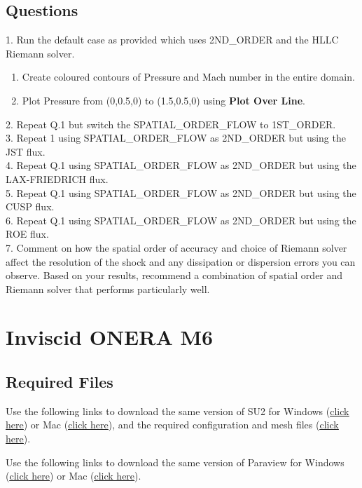 \section*{Questions}
1. Run the default case as provided which uses 2ND\_ORDER and the HLLC Riemann solver.
\begin{enumerate}[label=(\alph*)]
    \item Create coloured contours of Pressure and Mach number in the entire domain.
    \item Plot Pressure from (0,0.5,0) to (1.5,0.5,0) using \textbf{Plot Over Line}.
\end{enumerate}
2. Repeat Q.1 but switch the SPATIAL\_ORDER\_FLOW to 1ST\_ORDER. \\
3. Repeat 1 using SPATIAL\_ORDER\_FLOW as 2ND\_ORDER but using the JST flux. \\
4. Repeat Q.1 using SPATIAL\_ORDER\_FLOW as 2ND\_ORDER but using the LAX-FRIEDRICH flux. \\
5. Repeat Q.1 using SPATIAL\_ORDER\_FLOW as 2ND\_ORDER but using the CUSP flux. \\
6. Repeat Q.1 using SPATIAL\_ORDER\_FLOW as 2ND\_ORDER but using the ROE flux. \\
7. Comment on how the spatial order of accuracy and choice of Riemann solver affect the resolution of the shock and any dissipation or dispersion errors you can observe. Based on your results, recommend a combination of spatial order and Riemann solver that performs particularly well.
\chapter{Inviscid ONERA M6}
\label{ch:Inviscid ONERA M6}
\section*{Required Files}
\begin{su2note}
	Use the following links to download the same version of SU2 for Windows (\href{https://users.encs.concordia.ca/~bvermeir/book/executables/windows/SU2_Windows.zip}{\underline{click here}}) or Mac (\href{https://users.encs.concordia.ca/~bvermeir/book/executables/osx/SU2_Mac.zip}{\underline{click here}}), and the required configuration and mesh files (\href{https://gitlab.com/bvermeir/book-cfd/blob/master/tutorial/tut3_invisicd_oneram6/oneram6_inviscid.zip}{\underline{click here}}).
\end{su2note}
\begin{paraviewnote}
	Use the following links to download the same version of Paraview for Windows (\href{https://users.encs.concordia.ca/~bvermeir/book/executables/windows/ParaView-5.4.0-Qt5-OpenGL2-Windows-64bit.exe}{\underline{click here}}) or Mac (\href{https://users.encs.concordia.ca/~bvermeir/book/executables/osx/ParaView-5.4.0-Qt5-OpenGL2-MPI-OSX10.8-64bit.dmg}{\underline{click here}}).
\end{paraviewnote}


